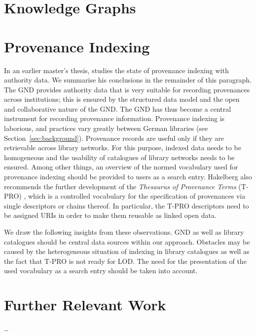 \section{Knowledge Graphs}
\label{sec:KGs}



\section{Provenance Indexing}
\label{sec:provenance_indexing}

In an earlier master's thesis, \textcite{Hakelberg2016}
studies the state of provenance indexing with authority data.
We summarise his conclusions in the remainder of this paragraph.
The \gls{GND} provides authority data that is
very suitable for recording provenances across institutions;
this is ensured by the structured data model
and the open and collaborative nature of the \gls{GND}.
The \gls{GND} has thus become a central instrument for recording
provenance information.
Provenance indexing is laborious, and
practices vary greatly between German libraries (see Section~\ref{sec:background}).
Provenance records are useful only if
they are retrievable across library networks.
For this purpose, indexed data needs to be homogeneous
and the usability of catalogues of library networks needs to be ensured.
Among other things, an overview
of the normed vocabulary used for provenance indexing
should be provided to users as a search entry.
Hakelberg also recommends the further development of the \emph{Thesaurus of Provenance Terms}
(T-PRO) \autocite{T-PRO}, which is a controlled vocabulary
for the specification of provenances via single descriptors or chains thereof.
In particular, the T-PRO descriptors need to be assigned URIs
in order to make them reusable as linked open data. %

We draw the following insights from these observations.
\gls{GND} as well as library catalogues should be central data sources within our approach.
Obstacles may be caused by
the heterogeneous situation of indexing in library catalogues
as well as the fact that T-PRO is not ready for LOD.
The need for the presentation of the used vocabulary as a search entry
should be taken into account.




\section{Further Relevant Work}
\label{sec:further}

\dots

